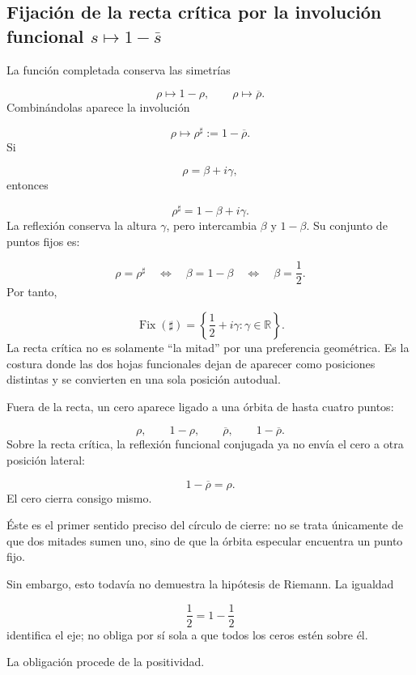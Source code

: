\subsection{Fijación de la recta crítica por la involución funcional \(s\mapsto1-\bar s\)}
La función completada conserva las simetrías\par
\[
\rho\longmapsto1-\rho,
\qquad
\rho\longmapsto\overline\rho.
\]
Combinándolas aparece la involución\par
\[
\rho\longmapsto\rho^\sharp
:=
1-\overline\rho.
\]
Si\par
\[
\rho=\beta+i\gamma,
\]
entonces\par
\[
\rho^\sharp
=
1-\beta+i\gamma.
\]
La reflexión conserva la altura \(\gamma\), pero intercambia \(\beta\) y \(1-\beta\). Su conjunto de puntos fijos es:\par
\[
\rho=\rho^\sharp
\quad\Longleftrightarrow\quad
\beta=1-\beta
\quad\Longleftrightarrow\quad
\beta=\frac12.
\]
Por tanto,\par
\[
\operatorname{Fix}(\sharp)
=
\left\{
\frac12+i\gamma:\gamma\in\mathbb R
\right\}.
\]
La recta crítica no es solamente “la mitad” por una preferencia geométrica. Es la costura donde las dos hojas funcionales dejan de aparecer como posiciones distintas y se convierten en una sola posición autodual.\par
Fuera de la recta, un cero aparece ligado a una órbita de hasta cuatro puntos:\par
\[
\rho,\qquad
1-\rho,\qquad
\overline\rho,\qquad
1-\overline\rho.
\]
Sobre la recta crítica, la reflexión funcional conjugada ya no envía el cero a otra posición lateral:\par
\[
1-\overline\rho=\rho.
\]
El cero cierra consigo mismo.\par
Éste es el primer sentido preciso del círculo de cierre: no se trata únicamente de que dos mitades sumen uno, sino de que la órbita especular encuentra un punto fijo.\par
Sin embargo, esto todavía no demuestra la hipótesis de Riemann. La igualdad\par
\[
\frac12=1-\frac12
\]
identifica el eje; no obliga por sí sola a que todos los ceros estén sobre él.\par
La obligación procede de la positividad.\par
{}
